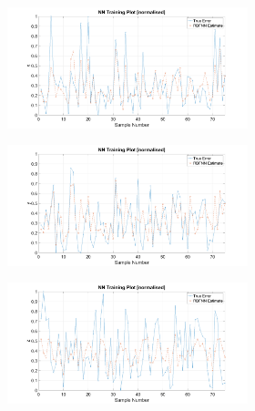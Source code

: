 \begin{figure}
  \begin{subfigure}{0.48\textwidth}
    \begin{subfigure}{\textwidth}
      \includegraphics[clip, trim = 100 0 100 0, width=\textwidth]{figures/chapter4/tr_x}
    \end{subfigure}
    \begin{subfigure}{\textwidth}
      \includegraphics[clip, trim = 100 0 100 0, width=\textwidth]{figures/chapter4/tr_y}
    \end{subfigure}
    \begin{subfigure}{\textwidth}
      \includegraphics[clip, trim = 100 0 100 0, width=\textwidth]{figures/chapter4/tr_z}

\end{subfigure}
\end{subfigure}
\end{figure}
